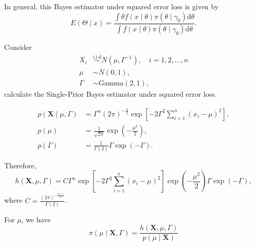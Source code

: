 In general, this Bayes estimator under squared error loss is given by
\begin{equation}
    E\left(\Theta\mid x\right) = \frac{\int\theta f\left(x\mid\theta\right)\pi\left(\theta\mid\gamma_0\right)\mathrm{d}\theta}{\int f\left(x\mid\theta\right)\pi\left(\theta\mid\gamma_0\right)\mathrm{d}\theta}.
\end{equation}

\begin{example}
    Consider
    \begin{equation*}
        \begin{aligned}
            X_i    & \stackrel{\text{i.i.d}}{\sim}N(\mu,\Gamma^{-1}),\quad i=1,2,\ldots,n \\
            \mu    & \sim N(0,1),                                                         \\
            \Gamma & \sim\text{Gamma}(2,1),
        \end{aligned}
    \end{equation*}
    calculate the Single-Prior Bayes estimator under squared error loss.
\end{example}

\begin{solution}
    \begin{equation*}
        \begin{aligned}
            p\left(\textbf{X}\mid\mu,\Gamma\right) & =\Gamma^n(2\pi)^{-\frac{n}{2}}\exp\left[-2\Gamma^2\sum_{i=1}^{n}(x_i-\mu)^2\right], \\
            p(\mu)                                 & =\frac{1}{\sqrt{2\pi}}\exp\left(-\frac{\mu^2}{2}\right),                            \\
            p(\Gamma)                              & =\frac{1}{\Gamma(2)}\Gamma\exp\left(-\Gamma\right).
        \end{aligned}
    \end{equation*}

    Therefore,
    \begin{equation*}
        h\left(\textbf{X},\mu,\Gamma\right)=C\Gamma^n\exp\left[-2\Gamma^2\sum_{i=1}^{n}(x_i-\mu)^2\right]\exp\left(-\frac{\mu^2}{2}\right)\Gamma\exp\left(-\Gamma\right),
    \end{equation*}
    where $C=\frac{(2\pi)^{-\frac{n+1}{2}}}{\Gamma(2)}$.

    For $\mu$, we have
    \begin{equation*}
        \pi\left(\mu\mid\textbf{X},\Gamma\right)=\frac{h\left(\textbf{X},\mu,\Gamma\right)}{p(\mu\mid\textbf{X})}
    \end{equation*}
\end{solution}

